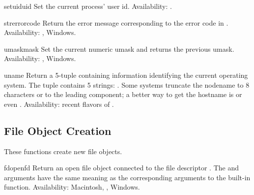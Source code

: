 \begin{funcdesc}{setuid}{uid}
Set the current process' user id.
Availability: \UNIX.
\end{funcdesc}

\begin{funcdesc}{strerror}{code}
Return the error message corresponding to the error code in
.
Availability: \UNIX, Windows.
\end{funcdesc}

\begin{funcdesc}{umask}{mask}
Set the current numeric umask and returns the previous umask.
Availability: \UNIX, Windows.
\end{funcdesc}

\begin{funcdesc}{uname}{}
Return a 5-tuple containing information identifying the current
operating system.  The tuple contains 5 strings:
.  Some systems truncate the nodename to 8
characters or to the leading component; a better way to get the
hostname is 
or even
.
Availability: recent flavors of \UNIX.
\end{funcdesc}



\subsection{File Object Creation \label{os-newstreams}}

These functions create new file objects.


\begin{funcdesc}{fdopen}{fd}
Return an open file object connected to the file descriptor .
The  and  arguments have the same meaning as
the corresponding arguments to the built-in 
function.
Availability: Macintosh, \UNIX, Windows.

\end{funcdesc}

